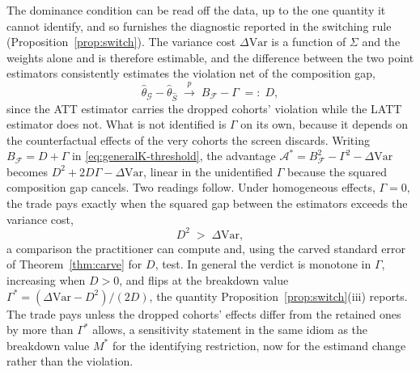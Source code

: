 \documentclass[12pt]{article}
\theoremstyle{remark}
\begin{document}
The dominance condition can be read off the data, up to the one quantity it cannot identify, and so
furnishes the diagnostic reported in the switching rule (Proposition~\ref{prop:switch}). The variance cost
$\Delta\mathrm{Var}$ is a
function of $\Sigma$ and the weights alone and is therefore estimable, and the difference between the two
point estimators consistently estimates the violation net of the composition gap,
\begin{equation}\label{eq:D-identified}
\hat\theta_{\mathcal G}-\hat\theta_{\hat S}\;\xrightarrow{p}\;B_{\mathcal F}-\Gamma\;=:\;D,
\end{equation}
since the ATT estimator carries the dropped cohorts' violation while the LATT estimator does not. What is
not identified is $\Gamma$ on its own, because it depends on the counterfactual effects of the very
cohorts the screen discards. Writing $B_{\mathcal F}=D+\Gamma$ in \eqref{eq:generalK-threshold}, the
advantage $\mathcal{A}^\ast=B_{\mathcal F}^2-\Gamma^2-\Delta\mathrm{Var}$ becomes
$D^2+2D\Gamma-\Delta\mathrm{Var}$, linear in the unidentified $\Gamma$ because the squared composition gap
cancels. Two readings follow. Under homogeneous effects, $\Gamma=0$, the trade pays exactly when the
squared gap between the estimators exceeds the variance cost,
\begin{equation}\label{eq:diagnostic}
D^2\;>\;\Delta\mathrm{Var},
\end{equation}
a comparison the practitioner can compute and, using the carved standard error of
Theorem~\ref{thm:carve} for $D$, test. In general the verdict is monotone in $\Gamma$, increasing
when $D>0$, and flips at the breakdown value $\Gamma^\ast=(\Delta\mathrm{Var}-D^2)/(2D)$, the quantity
Proposition~\ref{prop:switch}(iii) reports. The trade pays unless the dropped
cohorts' effects differ from the retained ones by more than $\Gamma^\ast$ allows, a sensitivity statement
in the same idiom as the breakdown value $M^\ast$ for the identifying restriction, now for the estimand
change rather than the violation.
\end{document}
